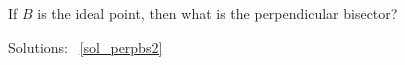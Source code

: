 \documentclass[a4paper]{article}
\begin{document}
If $B$ is the ideal point, then what is the perpendicular bisector?

Solutions: ~\ref{sol_perpbs2}










\end{document}
